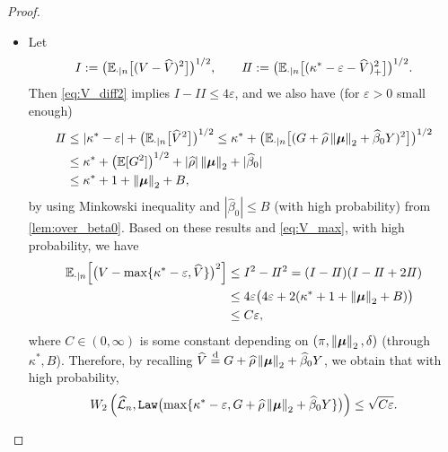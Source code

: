 \begin{proof}
\begin{itemize}
    \item Let
    \begin{equation*}
        I := \bigl( \mathbb{E}_{\cdot | n}\bigl[(V - \widehat V)^2\bigr] \bigr)^{1/2} 
        , \qquad
        I\!I := \bigl( \mathbb{E}_{\cdot | n}\bigl[(\kappa^* - \varepsilon - \widehat V)_+^2\bigr] \bigr)^{1/2}.
    \end{equation*}
    Then \cref{eq:V_diff2} implies $I - I\!I \le 4\varepsilon$, and we also have (for $\varepsilon > 0$ small enough)
    \begin{equation*}
        \begin{aligned}
            I\!I & \le \left|{\kappa^* - \varepsilon}\right| + \bigl( \mathbb{E}_{\cdot | n}\bigl[\widehat V^2\bigr] \bigr)^{1/2} 
            \le \kappa^* + \bigl( \mathbb{E}_{\cdot | n}\bigl[ (
                G + \widehat\rho \left\|{{\boldsymbol{\mu}}}\right\|_2 + \widehat\beta_0 Y
            )^2\bigr] \bigr)^{1/2}  \\
            & \le \kappa^* + \left(\mathbb{E}[G^2]\right)^{1/2} + |\widehat\rho| \left\|{{\boldsymbol{\mu}}}\right\|_2 + |\widehat\beta_0| \\
            & \le \kappa^* + 1 + \left\|{{\boldsymbol{\mu}}}\right\|_2 + B,
        \end{aligned}
    \end{equation*}
    by using Minkowski inequality and $|\hat\beta_0| \le B$ (with high probability) from \cref{lem:over_beta0}. Based on these results and \cref{eq:V_max}, with high probability, we have
    \begin{equation*}
        \begin{aligned}
            \mathbb{E}_{\cdot | n} \!\left[ \bigl(V - \max\{ \kappa^* - \varepsilon, \widehat V \} \bigr)^2 \right] 
            & \le I^2 - I\!I^2 = (I - I\!I)(I - I\!I + 2I\!I) \\
            & \le 4\varepsilon \bigl(4\varepsilon + 2 (\kappa^* + 1 + \left\|{{\boldsymbol{\mu}}}\right\|_2 + B) \bigr) \\
            & \le C \varepsilon,
        \end{aligned}
    \end{equation*}
    where $C \in (0, \infty)$ is some constant depending on $(\pi, \left\|{\text{\boldmath $\mu$}}\right\|_2, \delta)$ (through $\kappa^*, B$). Therefore, by recalling $\hat V \overset{\mathmakebox[0pt][c]{\mathrm{d}}}{=} G + \hat\rho \norm{\vmu}_2 + \hat\beta_0 Y$, we obtain that with high probability,
    \begin{equation}
        \label{eq:W2_conv}
        W_2\left( \widehat {\mathcal{L}}_{n}, \mathtt{Law} \bigl(\max\{ \kappa^* - \varepsilon, G + \widehat\rho \left\|{{\boldsymbol{\mu}}}\right\|_2 + \widehat\beta_0 Y \} \bigr) \right) \le \sqrt{C \varepsilon}.
    \end{equation}

\end{itemize}
\end{proof}
